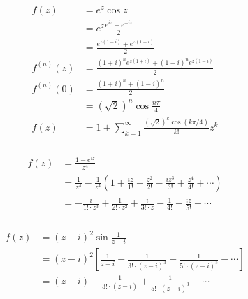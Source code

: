 \documentclass{article}
\begin{document}
\setcounter{subsubsection}{12}
\subsubsection{}

\begin{align*}
  f(z)       & = e^z \cos z                                                           \\
             & = e^z \frac{e^{i z} + e^{-i z}}{2}                                     \\
             & = \frac{e^{z (1 + i)} + e^{z (1 - i)}}{2}                              \\
  f^{(n)}(z) & = \frac{(1 + i)^n e^{z (1 + i)} + (1 - i)^n e^{z (1 - i)}}{2}          \\
  f^{(n)}(0) & = \frac{(1 + i)^n + (1 - i)^n}{2}                                      \\
             & = (\sqrt{2})^n \cos \frac{n \pi}{4}                                    \\
  f(z)       & = 1 + \sum_{k = 1}^\infty \frac{(\sqrt{2})^k \cos (k \pi / 4)}{k!} z^k
\end{align*}

\setcounter{subsubsection}{14}
\subsubsection{}

\begin{align*}
  f(z) & = \frac{1 - e^{i z}}{z^4}                                                                                                       \\
       & = \frac{1}{z^4} - \frac{1}{z^4} \left( 1 + \frac{i z}{1!} - \frac{z^2}{2!} - \frac{i z^3}{3!} + \frac{z^4}{4!} + \cdots \right) \\
       & = -\frac{i}{1! \cdot z^3} + \frac{1}{2! \cdot z^2} + \frac{i}{3! \cdot z} - \frac{1}{4!} - \frac{i z}{5!} + \cdots
\end{align*}

\setcounter{subsubsection}{16}
\subsubsection{}

\begin{align*}
  f(z) & = (z - i)^2 \sin \frac{1}{z - i}                                                                                  \\
       & = (z - i)^2 \left[ \frac{1}{z - i} - \frac{1}{3! \cdot (z - i)^3} + \frac{1}{5! \cdot (z - i)^5} - \cdots \right] \\
       & = (z - i) - \frac{1}{3! \cdot (z - i)} + \frac{1}{5! \cdot (z - i)^3} - \cdots
\end{align*}
\end{document}

